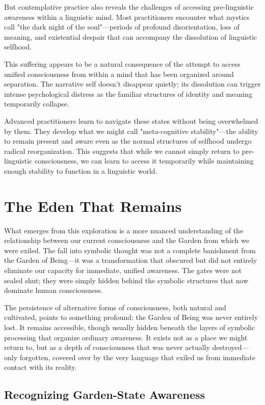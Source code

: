 But contemplative practice also reveals the challenges of accessing pre-linguistic awareness within a linguistic mind. Most practitioners encounter what mystics call "the dark night of the soul"—periods of profound disorientation, loss of meaning, and existential despair that can accompany the dissolution of linguistic selfhood.

This suffering appears to be a natural consequence of the attempt to access unified consciousness from within a mind that has been organized around separation. The narrative self doesn't disappear quietly; its dissolution can trigger intense psychological distress as the familiar structures of identity and meaning temporarily collapse.

Advanced practitioners learn to navigate these states without being overwhelmed by them. They develop what we might call "meta-cognitive stability"—the ability to remain present and aware even as the normal structures of selfhood undergo radical reorganization. This suggests that while we cannot simply return to pre-linguistic consciousness, we can learn to access it temporarily while maintaining enough stability to function in a linguistic world.

\section{The Eden That Remains}

What emerges from this exploration is a more nuanced understanding of the relationship between our current consciousness and the Garden from which we were exiled. The fall into symbolic thought was not a complete banishment from the Garden of Being—it was a transformation that obscured but did not entirely eliminate our capacity for immediate, unified awareness. The gates were not sealed shut; they were simply hidden behind the symbolic structures that now dominate human consciousness.

The persistence of alternative forms of consciousness, both natural and cultivated, points to something profound: the Garden of Being was never entirely lost. It remains accessible, though usually hidden beneath the layers of symbolic processing that organize ordinary awareness. It exists not as a place we might return to, but as a depth of consciousness that was never actually destroyed—only forgotten, covered over by the very language that exiled us from immediate contact with its reality.

\subsection{Recognizing Garden-State Awareness}

